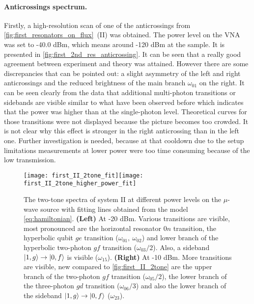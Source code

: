 \documentclass[12pt, twoside]{report}
\DeclarePairedDelimiter\ket{\lvert}{\rangle}
\numberwithin{equation}{section}
\begin{document}
\paragraph{Anticrossings spectrum.} Firstly, a high-resolution scan of one of the anticrossings from \autoref{fig:first_resonators_on_flux}~(II) was obtained. The power level on the VNA was set to -40.0 dBm, which means around -120 dBm at the sample. It is presented in \autoref{fig:first_2nd_res_anticrossing}. It can be seen that a really good agreement between experiment and theory was attained. However there are some discrepancies that can be pointed out: a slight asymmetry of the left and right anticrossings and the reduced brightness of the main branch $\omega_{01}$ on the right. It can be seen clearly from the data that additional multi-photon transitions or sidebands are visible similar to what have been observed before\cite{bishop2009} which indicates that the power was higher than at the single-photon level. Theoretical curves for those transitions were not displayed because the picture becomes too crowded. It is not clear why this effect is stronger in the right anticrossing than in the left one. Further investigation is needed, because at that cooldown due to the setup limitations measurements at lower power were too time consuming because of the low transmission.

\begin{figure}[t]
\centering
\texttt{[image: first\_II\_2tone\_fit]}\texttt{[image: first\_II\_2tone\_higher\_power\_fit]}

\caption{The two-tone spectra of system II at different power levels on the $\mu$-wave source with fitting lines obtained from the model \eqref{eq:hamiltonian}. \textbf{(Left)} At -20 dBm. Various transitions are visible, most pronounced are the horizontal resonator $0n$ transition, the hyperbolic qubit $ge$ transition ($\omega_{01},\ \omega_{02}$) and lower branch of the hyperbolic two-photon $gf$ transition ($\omega_{03}/2$). Also, a sideband $\ket{1,g}\rightarrow \ket{0,f}$ is visible ($\omega_{15}$). \textbf{(Right)} At -10 dBm. More transitions are visible, new compared to \autoref{fig:first_II_2tone} are the upper branch of the two-photon $gf$ transition ($\omega_{05}/2$), the lower branch of the three-photon $gd$ transition ($\omega_{06}/3$) and also the lower branch of the sideband $\ket{1,g}\rightarrow \ket{0,f}$ ($\omega_{23}$).}
\label{fig:first_II_2tone}
\end{figure}
\end{document}
